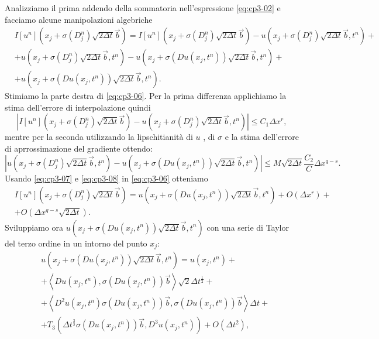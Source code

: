  Analizziamo il prima addendo della sommatoria nell'espressione \eqref{eq:cp3-02} e facciamo alcune manipolazioni algebriche
\begin{equation}
\label{eq:cp3-06}
\begin{split}
& I[u^n](x_j+\sigma(D_j^n)\sqrt{2\Delta t}\vec{b}) = I[u^n](x_j+\sigma(D_j^n)\sqrt{2\Delta t}\vec{b}) - u(x_j+\sigma(D_j^n)\sqrt{2\Delta t}\vec{b},t^n) + \\
& + u(x_j+\sigma(D_j^n)\sqrt{2\Delta t}\vec{b},t^n) - u(x_j+\sigma(Du(x_j,t^n))\sqrt{2\Delta t}\vec{b},t^n)+ \\
& + u(x_j+\sigma(Du(x_j,t^n))\sqrt{2\Delta t}\vec{b},t^n).
\end{split}
\end{equation}
Stimiamo la parte destra di \eqref{eq:cp3-06}. Per la prima differenza applichiamo la stima dell'errore di interpolazione quindi
\begin{equation}
\label{eq:cp3-07}
|I[u^n](x_j+\sigma(D_j^n)\sqrt{2\Delta t}\vec{b}) - u(x_j+\sigma(D_j^n)\sqrt{2\Delta t}\vec{b},t^n)|\le C_1\Delta x^r,
\end{equation}
mentre per la seconda utilizzando la lipschitianità di $u$ , di $\sigma$ e la stima dell'errore di aprrossimazione del gradiente ottendo:
\begin{equation}
\label{eq:cp3-08}
|u(x_j+\sigma(D_j^n)\sqrt{2\Delta t}\vec{b},t^n) - u(x_j+\sigma(Du(x_j,t^n))\sqrt{2\Delta t}\vec{b},t^n)|\le M\sqrt{2\Delta t}\frac{C_2}{C}\Delta x^{q-s}.
\end{equation}
Usando \eqref{eq:cp3-07} e \eqref{eq:cp3-08} in \eqref{eq:cp3-06} otteniamo
\[
\begin{split}
&I[u^n](x_j+\sigma(D_j^n)\sqrt{2\Delta t}\vec{b})=u(x_j+\sigma(Du(x_j,t^n))\sqrt{2\Delta t}\vec{b},t^n)+O(\Delta x^r)+ \\
& +O(\Delta x^{q-s}\sqrt{2\Delta t}).
\end{split}
\]
Sviluppiamo ora $u(x_j+\sigma(Du(x_j,t^n))\sqrt{2\Delta t}\vec{b},t^n)$ con una serie di Taylor del terzo ordine in un intorno del punto $x_j$:
\begin{equation}
\label{eq:cp3-09}
\begin{split}
&u(x_j+\sigma(Du(x_j,t^n))\sqrt{2\Delta t}\vec{b},t^n) = u(x_j,t^n)+ \\
&+\left<Du(x_j,t^n),\sigma(Du(x_j,t^n))\vec{b}\right>\sqrt{2}\Delta t^{\frac{1}{2}} +\\
&+\left<D^2u(x_j,t^n)\sigma(Du(x_j,t^n))\vec{b},\sigma(Du(x_j,t^n))\vec{b}\right>\Delta t + \\
&+T_3(\Delta t^{\frac{3}{2}}\sigma(Du(x_j,t^n))\vec{b},D^3u(x_j,t^n))+O(\Delta t^2), 
\end{split}
\end{equation}
